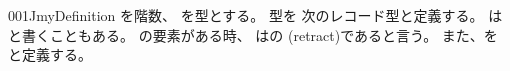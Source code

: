\documentclass[index]{subfiles}
\begin{document}
\begin{myBlock}{001J}{myDefinition}
  を階数、
  を型とする。
  型を
  次のレコード型と定義する。
  は
  と書くこともある。
  の要素がある時、
  はの
  (retract)であると言う。
  また、を
  と定義する。
\end{myBlock}
\end{document}
